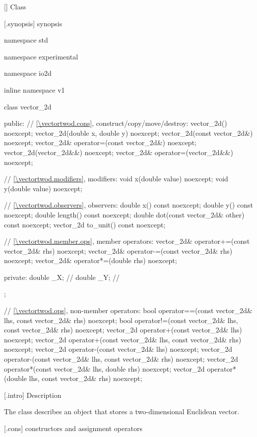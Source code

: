  [\vectortwod] {Class }

 [\vectortwod.synopsis] { synopsis}

\begin{codeblock}
namespace std { namespace experimental { namespace io2d { inline namespace v1 {
  class vector_2d {
  public:
    // \ref{\vectortwod.cons}, construct/copy/move/destroy:
    vector_2d() noexcept;
    vector_2d(double x, double y) noexcept;
    vector_2d(const vector_2d&) noexcept;
    vector_2d& operator=(const vector_2d&) noexcept;
    vector_2d(vector_2d&&) noexcept;
    vector_2d& operator=(vector_2d&&) noexcept;

    // \ref{\vectortwod.modifiers}, modifiers:
    void x(double value) noexcept;
    void y(double value) noexcept;
    
    // \ref{\vectortwod.observers}, observers:
    double x() const noexcept;
    double y() const noexcept;
    double length() const noexcept;
    double dot(const vector_2d& other) const noexcept;
    vector_2d to_unit() const noexcept;
    
    // \ref{\vectortwod.member.ops}, member operators:
    vector_2d& operator+=(const vector_2d& rhs) noexcept;
    vector_2d& operator-=(const vector_2d& rhs) noexcept;
    vector_2d& operator*=(double rhs) noexcept;
    
  private:
    double _X; // \expos
    double _Y; // \expos
  };
  
  // \ref{\vectortwod.ops}, non-member operators:
  bool operator==(const vector_2d& lhs, const vector_2d& rhs) noexcept;
  bool operator!=(const vector_2d& lhs, const vector_2d& rhs) noexcept;
  vector_2d operator+(const vector_2d& lhs) noexcept;
  vector_2d operator+(const vector_2d& lhs, const vector_2d& rhs) noexcept;
  vector_2d operator-(const vector_2d& lhs) noexcept;
  vector_2d operator-(const vector_2d& lhs, const vector_2d& rhs) noexcept;
  vector_2d operator*(const vector_2d& lhs, double rhs) noexcept;
  vector_2d operator*(double lhs, const vector_2d& rhs) noexcept;
} } } }
\end{codeblock}

 [\vectortwod.intro] { Description}

\pnum
{}
The class  describes an object that stores a two-dimensional Euclidean vector.

 [\vectortwod.cons] { constructors and assignment operators}

